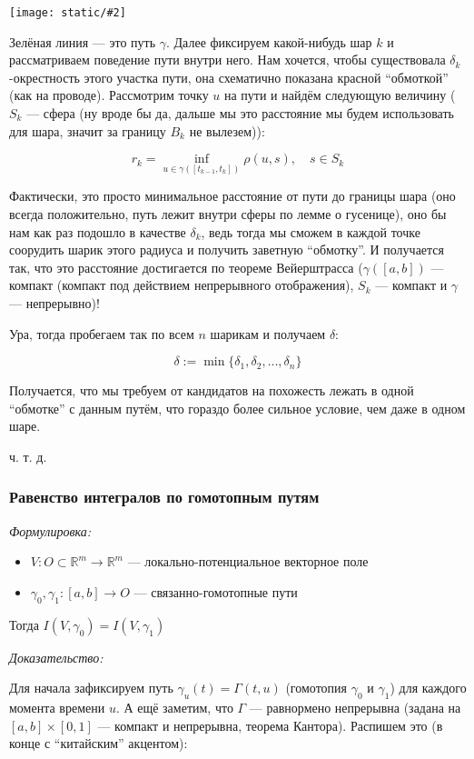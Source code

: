 \documentclass{article}
\def\images#1#2{\begin{center}\texttt{[image: static/\#2]}\end{center}}
\begin{document}
\images{0.35}{lemm_blz_dann.jpg}

Зелёная линия --- это путь $\gamma$. Далее фиксируем какой-нибудь шар $k$ и рассматриваем поведение пути внутри него. Нам хочется, чтобы существовала $\delta_k$-окрестность этого участка пути, она схематично показана красной ``обмоткой'' (как на проводе). Рассмотрим точку $u$ на пути и найдём следующую величину ($S_k$ --- сфера (ну вроде бы да, дальше мы это расстояние мы будем использовать для шара, значит за границу $B_k$ не вылезем)):

\[r_k = \inf_{u \in \gamma([t_{k - 1}, t_k])} \rho(u, s), \quad s \in S_k\]

Фактически, это просто минимальное расстояние от пути до границы шара (оно всегда положительно, путь лежит внутри сферы по лемме о гусенице), оно бы нам как раз подошло в качестве $\delta_k$, ведь тогда мы сможем в каждой точке соорудить шарик этого радиуса и получить заветную ``обмотку''. И получается так, что это расстояние достигается по теореме Вейерштрасса ($\gamma([a, b])$ --- компакт (компакт под действием непрерывного отображения), $S_k$ --- компакт и $\gamma$ --- непрерывно)!

Ура, тогда пробегаем так по всем $n$ шарикам и получаем $\delta$:

\[\delta := \min \{ \delta_1, \delta_2, \ldots, \delta_n \} \]

Получается, что мы требуем от кандидатов на похожесть лежать в одной ``обмотке'' с данным путём, что гораздо более сильное условие, чем даже в одном шаре.

ч. т. д. 

\subsubsection{Равенство интегралов по гомотопным путям}
\textit{Формулировка:}

\begin{itemize}
    \item $V: O \subset \mathbb{R}^m \rightarrow \mathbb{R}^m$ --- локально-потенциальное векторное поле
    \item $\gamma_0, \gamma_1: [a, b] \rightarrow O$ --- связанно-гомотопные пути
\end{itemize}

Тогда $I(V, \gamma_0) = I(V, \gamma_1)$

\textit{Доказательство:}

Для начала зафиксируем путь $\gamma_u(t) = \Gamma(t, u)$ (гомотопия $\gamma_0$ и $\gamma_1$) для каждого момента времени $u$. А ещё заметим, что $\Gamma$ --- равнормено непрерывна (задана на $[a, b] \times [0, 1]$ --- компакт и непрерывна, теорема Кантора). Распишем это (в конце с ``китайским'' акцентом):
\end{document}
